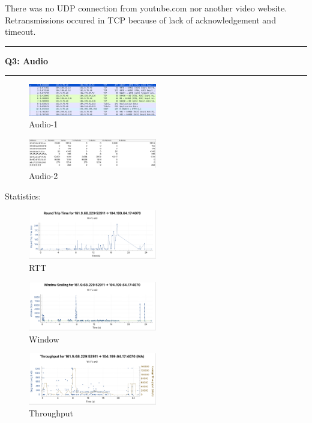 \documentclass[11pt]{article}
\newcommand\question[2]{\vspace{.25in}\hrule\textbf{#1: #2}\vspace{.5em}\hrule\vspace{.10in}}
\begin{document}
	There was no UDP connection from youtube.com nor another video website. Retransmissions occured in TCP because of lack of acknowledgement and timeout.
	
	\cleardoublepage

	\question{Q3}{Audio}
	
	\begin{figure}[H]
		\centering
		\includegraphics[width=0.5\textwidth]{images/audio-1.png}
		\caption{Audio-1}
		\label{fig:Audio-1}
	\end{figure}
	
	\begin{figure}[H]
		\centering
		\includegraphics[width=0.5\textwidth]{images/audio-2.png}
		\caption{Audio-2}
		\label{fig:Audio-2}
	\end{figure}

	Statistics:
	
	\begin{figure}[H]
		\centering
		\includegraphics[width=0.5\textwidth]{images/rtt.png}
		\caption{RTT}
		\label{fig:RTT}
	\end{figure}

	\begin{figure}[H]
		\centering
		\includegraphics[width=0.5\textwidth]{images/window.png}
		\caption{Window}
		\label{fig:Window}
	\end{figure}

	\begin{figure}[H]
		\centering
		\includegraphics[width=0.5\textwidth]{images/throughput.png}
		\caption{Throughput}
		\label{fig:Throughput}
	\end{figure}
\end{document}
